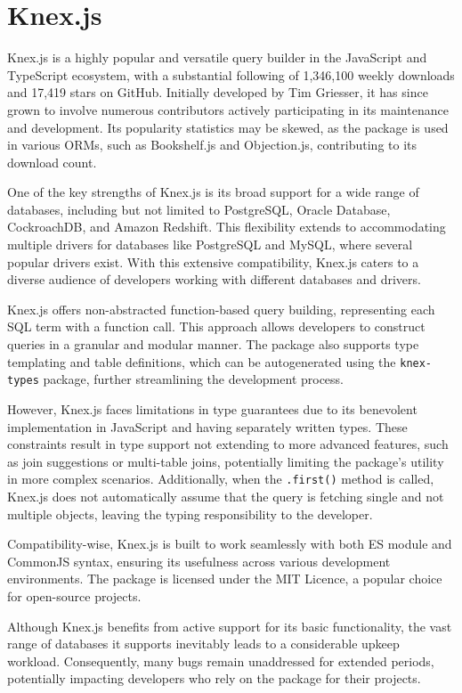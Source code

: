 \section{Knex.js}
Knex.js is a highly popular and versatile query builder in the JavaScript and
TypeScript ecosystem, with a substantial following of 1,346,100 weekly downloads
and 17,419 stars on GitHub. Initially developed by Tim Griesser, it has since
grown to involve numerous contributors actively participating in its maintenance
and development. Its popularity statistics may be skewed, as the package is used
in various ORMs, such as Bookshelf.js and Objection.js, contributing to its
download count.

One of the key strengths of Knex.js is its broad support for a wide range of
databases, including but not limited to PostgreSQL, Oracle Database,
CockroachDB, and Amazon Redshift. This flexibility extends to accommodating
multiple drivers for databases like PostgreSQL and MySQL, where several popular
drivers exist. With this extensive compatibility, Knex.js caters to a diverse
audience of developers working with different databases and drivers.

Knex.js offers non-abstracted function-based query building, representing each
SQL term with a function call. This approach allows developers to construct
queries in a granular and modular manner. The package also supports type
templating and table definitions, which can be autogenerated using the
\texttt{knex-types} package, further streamlining the development process.

However, Knex.js faces limitations in type guarantees due to its benevolent
implementation in JavaScript and having separately written types. These
constraints result in type support not extending to more advanced features, such
as join suggestions or multi-table joins, potentially limiting the package's
utility in more complex scenarios. Additionally, when the \texttt{.first()}
method is called, Knex.js does not automatically assume that the query is
fetching single and not multiple objects, leaving the typing responsibility to
the developer.

Compatibility-wise, Knex.js is built to work seamlessly with both ES module and
CommonJS syntax, ensuring its usefulness across various development
environments. The package is licensed under the MIT Licence, a popular choice
for open-source projects.

Although Knex.js benefits from active support for its basic functionality, the
vast range of databases it supports inevitably leads to a considerable upkeep
workload. Consequently, many bugs remain unaddressed for extended periods,
potentially impacting developers who rely on the package for their projects.

